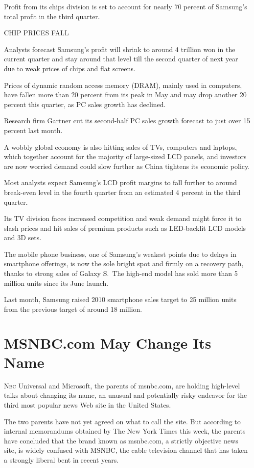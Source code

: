 ﻿\documentclass[12pt]{article}
\begin{document}
Profit from its chips division is set to account for nearly 70 percent of Samsung's total profit in
the third quarter.

CHIP PRICES FALL

Analysts forecast Samsung's profit will shrink to around 4 trillion won in the current quarter and
stay around that level till the second quarter of next year due to weak prices of chips and flat
screens.

Prices of dynamic random access memory (DRAM), mainly used in computers, have fallen more than 20
percent from its peak in May and may drop another 20 percent this quarter, as PC sales growth has
declined.

Research firm Gartner cut its second-half PC sales growth forecast to just over 15 percent last
month.

A wobbly global economy is also hitting sales of TVs, computers and laptops, which together account
for the majority of large-sized LCD panels, and investors are now worried demand could slow further
as China tightens its economic policy.

Most analysts expect Samsung's LCD profit margins to fall further to around break-even level in the
fourth quarter from an estimated 4 percent in the third quarter.

Its TV division faces increased competition and weak demand might force it to slash prices and hit
sales of premium products such as LED-backlit LCD models and 3D sets.

The mobile phone business, one of Samsung's weakest points due to delays in smartphone offerings, is
now the sole bright spot and firmly on a recovery path, thanks to strong sales of Galaxy S.~The
high-end model has sold more than 5 million units since its June launch.

Last month, Samsung raised 2010 smartphone sales target to 25 million units from the previous target
of around 18 million.

\section{MSNBC.com May Change Its Name}

\lettrine{N}{bc} Universal and Microsoft, the parents of msnbc.com, are
holding high-level talks about changing its name, an unusual and potentially risky endeavor for the
third most popular news Web site in the United States.

The two parents have not yet agreed on what to call the site. But according to internal memorandums
obtained by The New York Times this week, the parents have concluded that the brand known as
msnbc.com, a strictly objective news site, is widely confused with MSNBC, the cable television
channel that has taken a strongly liberal bent in recent years.
\end{document}
